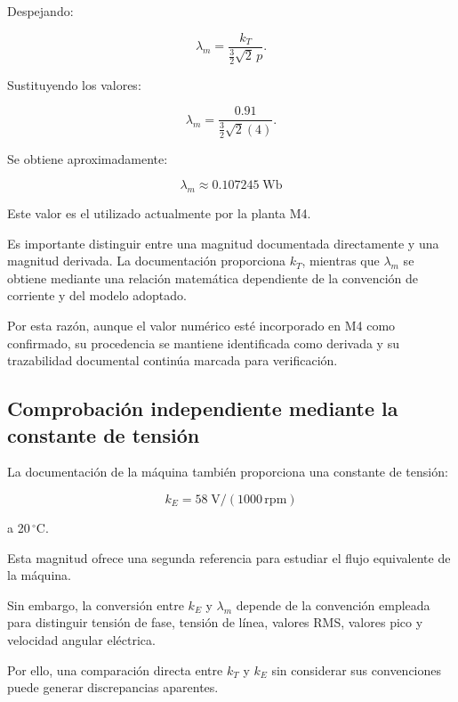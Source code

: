 Despejando:

\begin{equation}
\lambda_m
=
\frac{k_T}
{\frac{3}{2}\sqrt{2}\,p}.
\end{equation}

Sustituyendo los valores:

\begin{equation}
\lambda_m
=
\frac{0.91}
{\frac{3}{2}\sqrt{2}(4)}.
\end{equation}

Se obtiene aproximadamente:

\begin{equation}
\boxed{
\lambda_m\approx0.107245\;\mathrm{Wb}
}
\end{equation}

Este valor es el utilizado actualmente por la planta M4.

Es importante distinguir entre una magnitud documentada directamente y una magnitud derivada. La documentación proporciona $k_T$, mientras que $\lambda_m$ se obtiene mediante una relación matemática dependiente de la convención de corriente y del modelo adoptado.

Por esta razón, aunque el valor numérico esté incorporado en M4 como confirmado, su procedencia se mantiene identificada como derivada y su trazabilidad documental continúa marcada para verificación.

\subsection{Comprobación independiente mediante la constante de tensión}

La documentación de la máquina también proporciona una constante de tensión:

\begin{equation}
k_E=58\;\mathrm{V/(1000\,rpm)}
\end{equation}

a 20\,${}^{\circ}$C.

Esta magnitud ofrece una segunda referencia para estudiar el flujo equivalente de la máquina.

Sin embargo, la conversión entre $k_E$ y $\lambda_m$ depende de la convención empleada para distinguir tensión de fase, tensión de línea, valores RMS, valores pico y velocidad angular eléctrica.

Por ello, una comparación directa entre $k_T$ y $k_E$ sin considerar sus convenciones puede generar discrepancias aparentes.

